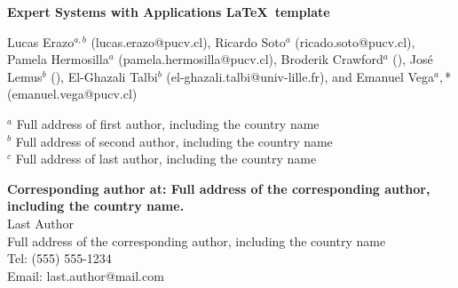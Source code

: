 \documentclass[review]{elsarticle}
\begin{document}
\begin{frontmatter}


\begin{titlepage}
\begin{center}
\vspace*{1cm}

\textbf{ \large Expert Systems with Applications \LaTeX\ template}

\vspace{1.5cm}

Lucas Erazo$^{a,b}$ (lucas.erazo@pucv.cl), Ricardo Soto$^a$ (ricado.soto@pucv.cl), Pamela Hermosilla$^a$ (pamela.hermosilla@pucv.cl), Broderik Crawford$^a$ (), José Lemus$^b$ (), El-Ghazali Talbi$^b$ (el-ghazali.talbi@univ-lille.fr), and Emanuel Vega$^a,$* (emanuel.vega@pucv.cl) \\

\hspace{10pt}

\begin{flushleft}
\small  
$^a$ Full address of first author, including the country name \\
$^b$ Full address of second author, including the country name \\
$^c$ Full address of last author, including the country name

\vspace{1cm}
\textbf{Corresponding author at: Full address of the corresponding author, including the country name.} \\
Last Author \\
Full address of the corresponding author, including the country name \\
Tel: (555) 555-1234 \\
Email: last.author@mail.com


\end{flushleft}
\end{center}
\end{titlepage}
\end{frontmatter}
\end{document}
